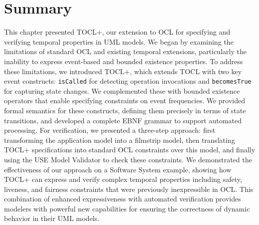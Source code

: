 \section{Summary}
\hspace{1cm} This chapter presented TOCL+, our extension to OCL for specifying and verifying temporal properties in UML models. We began by examining the limitations of standard OCL and existing temporal extensions, particularly the inability to express event-based and bounded existence properties. To address these limitations, we introduced TOCL+, which extends TOCL with two key event constructs: \texttt{isCalled} for detecting operation invocations and \texttt{becomesTrue} for capturing state changes. We complemented these with bounded existence operators that enable specifying constraints on event frequencies. We provided formal semantics for these constructs, defining them precisely in terms of state transitions, and developed a complete EBNF grammar to support automated processing. For verification, we presented a three-step approach: first transforming the application model into a filmstrip model, then translating TOCL+ specifications into standard OCL constraints over this model, and finally using the USE Model Validator to check these constraints. We demonstrated the effectiveness of our approach on a Software System example, showing how TOCL+ can express and verify complex temporal properties including safety, liveness, and fairness constraints that were previously inexpressible in OCL. This combination of enhanced expressiveness with automated verification provides modelers with powerful new capabilities for ensuring the correctness of dynamic behavior in their UML models.